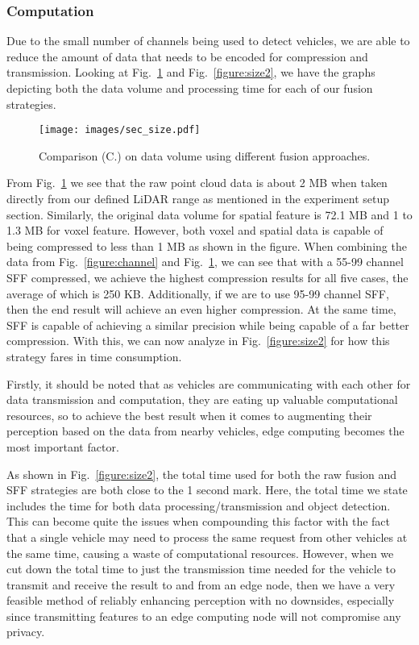 \documentclass[sigconf]{acmart}
\begin{document}
\subsubsection{Computation}

Due to the small number of channels being used to detect vehicles, we are able to reduce the amount of data that needs to be encoded for compression and transmission. Looking at Fig.~\ref{figure:size1} and Fig.~\ref{figure:size2}, we have the graphs depicting both the data volume and processing time for each of our fusion strategies. 

\begin{figure}[!h]
\centering
\texttt{[image: images/sec\_size.pdf]}
\vspace{-11pt}
\caption{Comparison (C.) on data volume using different fusion approaches.}
\vspace{-11pt}
\label{figure:size1}
\end{figure}

From Fig.~\ref{figure:size1} we see that the raw point cloud data is about 2 MB when taken directly from our defined LiDAR range as mentioned in the experiment setup section.
Similarly, the original data volume for spatial feature is 72.1 MB and 1 to 1.3 MB for voxel feature. However, both voxel and spatial data is capable of being compressed to less than 1 MB as shown in the figure. When combining the data from Fig.~\ref{figure:channel} and Fig.~\ref{figure:size1}, we can see that with a 55-99 channel SFF compressed, we achieve the highest compression results for all five cases, the average of which is 250 KB. Additionally, if we are to use 95-99 channel SFF, then the end result will achieve an even higher compression. 
At the same time, SFF is capable of achieving a similar precision while being capable of a far better compression. With this, we can now analyze in Fig.~\ref{figure:size2} for how this strategy fares in time consumption. 

Firstly, it should be noted that as vehicles are communicating with each other for data transmission and computation, they are eating up valuable computational resources, so to achieve the best result when it comes to augmenting their perception based on the data from nearby vehicles, edge computing becomes the most important factor. 


As shown in Fig.~\ref{figure:size2}, the total time used for both the raw fusion and SFF strategies are both close to the 1 second mark.
Here, the total time we state includes the time for both data processing/transmission and object detection.
This can become quite the issues when compounding this factor with the fact that a single vehicle may need to process the same request from other vehicles at the same time, causing a waste of computational resources. However, when we cut down the total time to just the transmission time needed for the vehicle to transmit and receive the result to and from an edge node, then we have a very feasible method of reliably enhancing perception with no downsides, especially since transmitting features to an edge computing node will not compromise any privacy.
\end{document}
